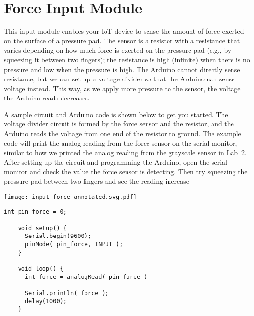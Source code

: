 
\clearpage
\section{Force Input Module}
\label{sec-input-force}


This input module enables your IoT device to sense the amount of force
exerted on the surface of a pressure pad. The sensor is a resistor with
a resistance that varies depending on how much force is exerted on the
pressure pad (e.g., by squeezing it between two fingers); the resistance
is high (infinite) when there is no pressure and low when the pressure
is high. The Arduino cannot directly sense resistance, but we can set up
a voltage divider so that the Arduino can sense voltage instead. This
way, as we apply more pressure to the sensor, the voltage the Arduino
reads decreases.


A sample circuit and Arduino code is shown below to get you started.
The voltage divider circuit is formed by the force sensor and the
 resistor, and the Arduino reads the voltage from one end
of the resistor to ground. The example code will print the analog
reading from the force sensor on the serial monitor, similar to how we
printed the analog reading from the grayscale sensor in Lab~2. After
setting up the circuit and programming the Arduino, open the serial
monitor and check the value the force sensor is detecting. Then try
squeezing the pressure pad between two fingers and see the reading
increase.

\vspace{0.1in}
\begin{minipage}[t]{0.49\tw}
  \vspace{0pt}

  \texttt{[image: input-force-annotated.svg.pdf]}
\end{minipage}
\hfill
\begin{minipage}[t]{0.49\tw}
  \vspace{0.1in}
  \begin{Verbatim}[gobble=3,fontsize=\small]
    int pin_force = 0;

    void setup() {
      Serial.begin(9600);
      pinMode( pin_force, INPUT );
    }

    void loop() {
      int force = analogRead( pin_force )

      Serial.println( force );
      delay(1000);
    }
  \end{Verbatim}
\end{minipage}
\vspace{0.1in}

